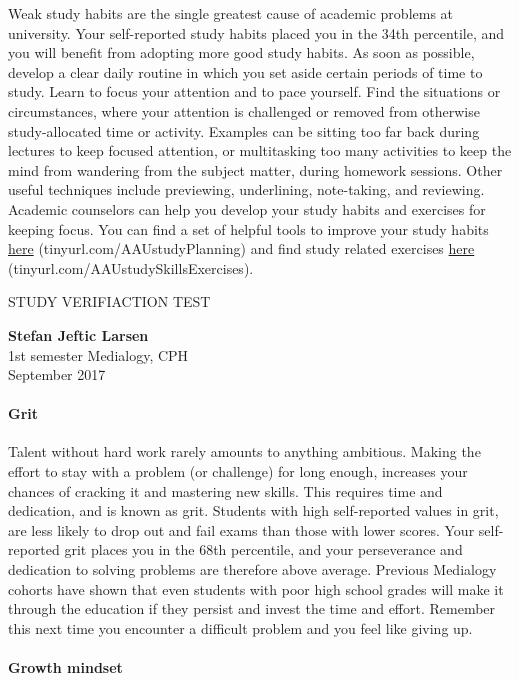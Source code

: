 \documentclass[]{article}
\let\oldparagraph\paragraph
\renewcommand{\paragraph}[1]{\oldparagraph{#1}\mbox{}}
\begin{document}
Weak study habits are the single greatest cause of academic problems at
university. Your self-reported study habits placed you in the 34th
percentile, and you will benefit from adopting more good study habits.
As soon as possible, develop a clear daily routine in which you set
aside certain periods of time to study. Learn to focus your attention
and to pace yourself. Find the situations or circumstances, where your
attention is challenged or removed from otherwise study-allocated time
or activity. Examples can be sitting too far back during lectures to
keep focused attention, or multitasking too many activities to keep the
mind from wandering from the subject matter, during homework sessions.
Other useful techniques include previewing, underlining, note-taking,
and reviewing. Academic counselors can help you develop your study
habits and exercises for keeping focus. You can find a set of helpful
tools to improve your study habits
\href{tinyurl.com/AAUstudyPlanning}{here} (tinyurl.com/AAUstudyPlanning)
and find study related exercises
\href{tinyurl.com/AAUstudySkillsExercises}{here}
(tinyurl.com/AAUstudySkillsExercises).

\pagebreak

STUDY VERIFIACTION TEST

\textbf{Stefan Jeftic Larsen}\\
1st semester Medialogy, CPH\\
September 2017

\paragraph{Grit}\label{grit}

Talent without hard work rarely amounts to anything ambitious. Making
the effort to stay with a problem (or challenge) for long enough,
increases your chances of cracking it and mastering new skills. This
requires time and dedication, and is known as grit. Students with high
self-reported values in grit, are less likely to drop out and fail exams
than those with lower scores. Your self-reported grit places you in the
68th percentile, and your perseverance and dedication to solving
problems are therefore above average. Previous Medialogy cohorts have
shown that even students with poor high school grades will make it
through the education if they persist and invest the time and effort.
Remember this next time you encounter a difficult problem and you feel
like giving up.

\paragraph{Growth mindset}\label{growth-mindset}
\end{document}
